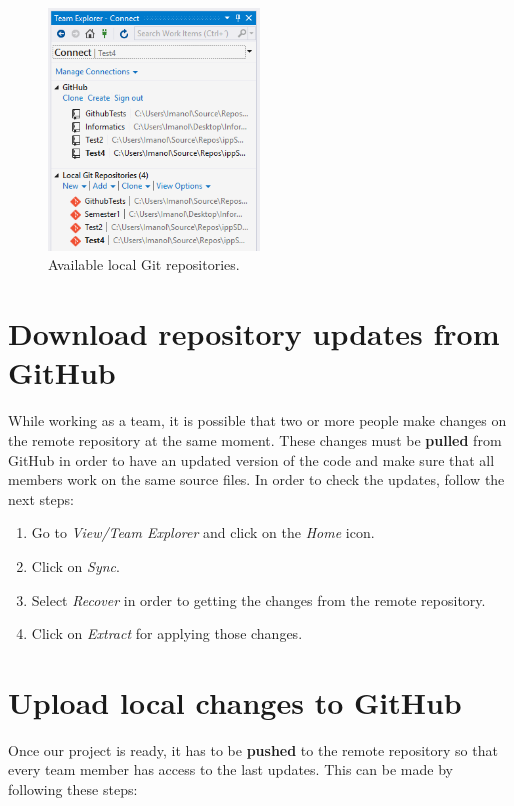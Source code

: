 \begin{figure}[H]
	\centering
	\includegraphics[width= 0.5\textwidth]{Figures/GHC3V3.png}
	\caption{Available local Git repositories.}
	\label{fig:GitHubClone2}
\end{figure}

    \section{Download repository updates from GitHub}

While working as a team, it is possible that two or more people make changes on the remote repository at the same moment. These changes must be \textbf{pulled} from GitHub in order to have an updated version of the code and make sure that all members work on the same source files. In order to check the updates, follow the next steps:

\begin{enumerate}
	\item Go to \textit{View/Team Explorer} and click on the \textit{Home} icon.
	\item Click on \textit{Sync}.
	\item Select \textit{Recover} in order to getting the changes from the remote repository.
	\item Click on \textit{Extract} for applying those changes.
\end{enumerate}

    \section{Upload local changes to GitHub}

Once our project is ready, it has to be \textbf{pushed} to the remote repository so that every team member has access to the last updates. This can be made by following these steps:

